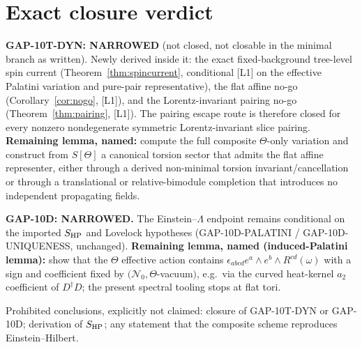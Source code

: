 \documentclass[11pt,a4paper]{article}
\begin{document}
\section{Exact closure verdict}
\begin{tcolorbox}[colback=orange!6!white,colframe=orange!70!black,
title=Verdict]
\textbf{GAP-10T-DYN: NARROWED} (not closed, not closable in the minimal
branch as written).  Newly derived inside it:
the exact fixed-background tree-level spin current
(Theorem~\ref{thm:spincurrent}, conditional [L1] on the effective Palatini
variation and pure-pair representative), the flat affine no-go
(Corollary~\ref{cor:nogo}, [L1]), and the Lorentz-invariant pairing no-go
(Theorem~\ref{thm:pairing}, [L1]).  The pairing escape route is therefore
closed for every nonzero nondegenerate symmetric Lorentz-invariant slice
pairing.  \textbf{Remaining lemma, named:} compute the full composite
$\Theta$-only variation and construct from $S[\Theta]$ a canonical torsion
sector that admits the flat affine representer, either through a derived
non-minimal torsion invariant/cancellation or through a translational or
relative-bimodule completion that introduces no independent propagating
fields.

\medskip
\textbf{GAP-10D: NARROWED.}  The Einstein--$\Lambda$ endpoint remains
conditional on the imported $S_{\rm HP}$ and Lovelock hypotheses
(GAP-10D-PALATINI / GAP-10D-UNIQUENESS, unchanged).  \textbf{Remaining
lemma, named (induced-Palatini lemma):} show that the $\Theta$ effective
action contains $\epsilon_{abcd}e^a\wedge e^b\wedge R^{cd}(\omega)$ with a
sign and coefficient fixed by $(\mathcal N_0,\Theta$-vacuum$)$, e.g.\ via
the curved heat-kernel $a_2$ coefficient of $D^\dagger D$; the present
spectral tooling stops at flat tori.

\medskip
Prohibited conclusions, explicitly not claimed: closure of GAP-10T-DYN or
GAP-10D; derivation of $S_{\rm HP}$; any statement that the composite
scheme reproduces Einstein--Hilbert.
\end{tcolorbox}
\end{document}
